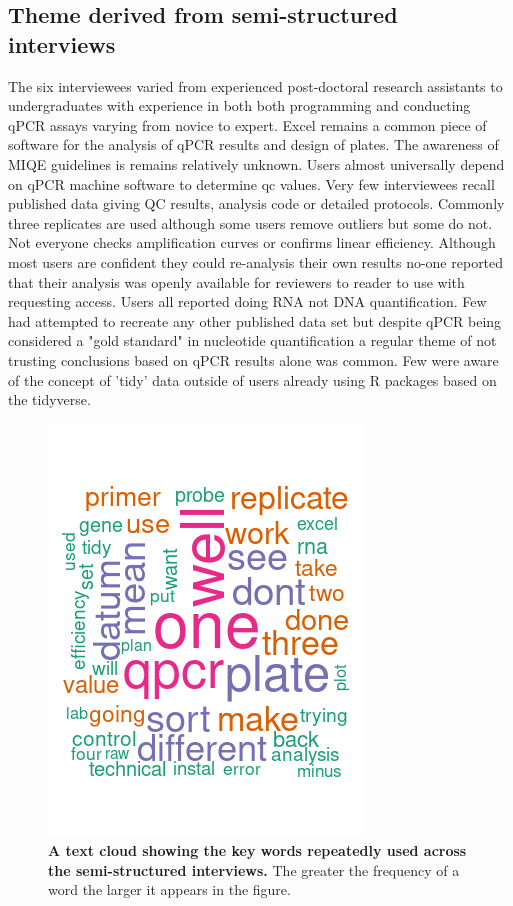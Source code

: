 \documentclass{SBCbookchapter}
\begin{document}
\subsection{Theme derived from semi-structured interviews}
The six interviewees varied from experienced post-doctoral research assistants to undergraduates with experience in both both programming and conducting qPCR assays varying from novice to expert.
Excel remains a common piece of software for the analysis of qPCR results and design of plates.
The awareness of MIQE guidelines is remains relatively unknown.
Users almost universally depend on qPCR machine software to determine qc values.
Very few interviewees recall published data giving QC results, analysis code or detailed protocols.
Commonly three replicates are used although some users remove outliers but some do not.
Not everyone checks amplification curves or confirms linear efficiency.
Although most users are confident they could re-analysis their own results no-one reported that their analysis was openly available for reviewers to reader to use with requesting access.
Users all reported doing RNA not DNA quantification.
Few had attempted to recreate any other published data set but despite qPCR being considered a "gold standard" in nucleotide quantification a regular theme of not trusting conclusions based on qPCR results alone was common. 
Few were aware of the concept of 'tidy' data outside of users already using R packages  based on the tidyverse.

\begin{figure}[t]

{\centering \includegraphics[width=0.5\linewidth]{figures/mg_rb_ck_ec_db_semi_structured_word_cloud} 

}

\caption{\textbf{A text cloud showing the key words repeatedly used across the semi-structured interviews.} The greater the frequency of a word the larger it appears in the figure. }\label{fig:semi-structured-test-cloud}
\end{figure}
\end{document}
